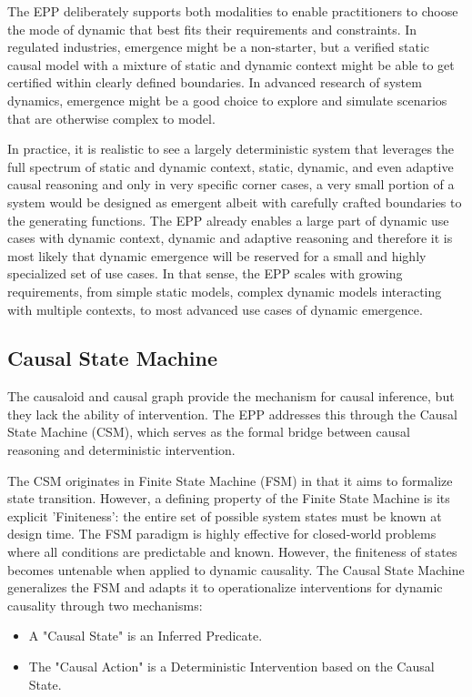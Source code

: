 The EPP deliberately supports both modalities to enable practitioners to choose the mode of dynamic that best fits their requirements and constraints. In regulated industries, emergence might be a non-starter, but a verified static causal model with a mixture of static and dynamic context might be able to get certified within clearly defined boundaries. In advanced research of system dynamics, emergence might be a good choice to explore and simulate scenarios that are otherwise complex to model. 

In practice, it is realistic to see a largely deterministic system that leverages the full spectrum of static and dynamic context, static, dynamic, and even adaptive causal reasoning and only in very specific corner cases, a very small portion of a system would be designed as emergent albeit with  carefully crafted boundaries to the generating functions. The EPP already enables a large part of dynamic use cases with dynamic context, dynamic and adaptive reasoning and therefore it is most likely that dynamic emergence will be reserved for a small and highly specialized set of use cases. In that sense, the EPP scales with growing requirements, from simple static models, complex dynamic models interacting with multiple contexts, to most advanced use cases of dynamic emergence. 

%
%
\subsection{Causal State Machine}
\label{sec:epp_csm}

The causaloid and causal graph provide the mechanism for causal inference, 
but they lack the ability of intervention. The EPP addresses this through the Causal State Machine (CSM), which serves as the formal bridge between causal reasoning and deterministic intervention.

The CSM originates in Finite State Machine (FSM) in that it aims to formalize state transition.
However, a defining property of the Finite State Machine is its explicit 'Finiteness': the entire set of possible system states must be known at design time. The FSM paradigm is highly effective for closed-world problems where all conditions are predictable and known. However, the finiteness of states becomes untenable when applied to dynamic causality. The Causal State Machine generalizes the FSM and adapts it 
to operationalize interventions for dynamic causality through two mechanisms:
 
\begin{itemize}
	\item A "Causal State" is an Inferred Predicate. 
	\item The "Causal Action" is a Deterministic Intervention based on the  Causal State.
\end{itemize}

